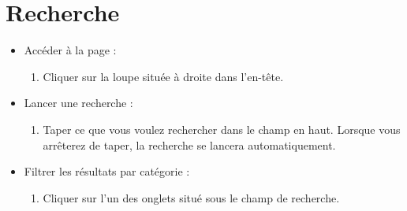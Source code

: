 \documentclass[12pt, letterpaper]{article}
\begin{document}
    \section*{Recherche}
    \begin{itemize}
        \item Accéder à la page :
        \begin{enumerate}
            \item Cliquer sur la loupe située à droite dans l'en-tête.
        \end{enumerate}
        
        \item Lancer une recherche :
        \begin{enumerate}
            \item Taper ce que vous voulez rechercher dans le champ en haut. Lorsque vous arrêterez de taper, la recherche se lancera automatiquement.
        \end{enumerate}

        \item Filtrer les résultats par catégorie :
        \begin{enumerate}
            \item Cliquer sur l'un des onglets situé sous le champ de recherche.
        \end{enumerate}
    \end{itemize}
    
\end{document}
